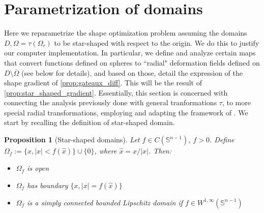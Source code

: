 \documentclass[english,a4paper,10pt,oneside]{scrbook}	%
\theoremstyle{break}
\newtheorem{prop}[equation]{Proposition}
\theoremstyle{remark}
\newtheorem{obs}[equation]{Observation}
\newcommand{\mS}{\mathbb{S}^{n-1}}
\newcommand{\xh}{\hat{x}}
\begin{document}

\section{Parametrization of domains}
\label{sec:star}

Here we reparametrize the shape optimization problem assuming the domains $D, \Omega=\tau(\Omega_r)$ to be star-shaped with respect to the origin. We do this to justify our computer implementation. In particular, we define and analyze certain maps that convert functions defined on spheres to ``radial" deformation fields defined on $D\setminus \overline{\Omega}$ (see below for details), and based on those, detail the expression of the shape gradient of \cref{prop:gateaux_diff}. This will be the result of \cref{prop:star_shaped_gradient}. Essentially, this section is concerned with connecting the analysis previously done with general tranformations $\tau$, to more special radial transformations, employing and adapting the framework of \cite{deckelnick}. We start by recalling the definition of star-shaped domain.


\begin{prop}[Star-shaped domains]
Let $f \in C(\mS)$, $f>0$. Define $\Omega_f:=\{x, |x|<f(\xh)\}\cup\{0\}$, where $\xh=x/|x|$. Then:
\begin{itemize}
\item $\Omega_f$ is open
\item $\Omega_f$ has boundary $\{x, |x|=f(\xh)\}$
\item $\Omega_f$ is a simply connected bounded Lipschitz domain if $f \in W^{1,\infty}(\mS)$
\end{itemize}
\end{prop}
%
\end{document}
